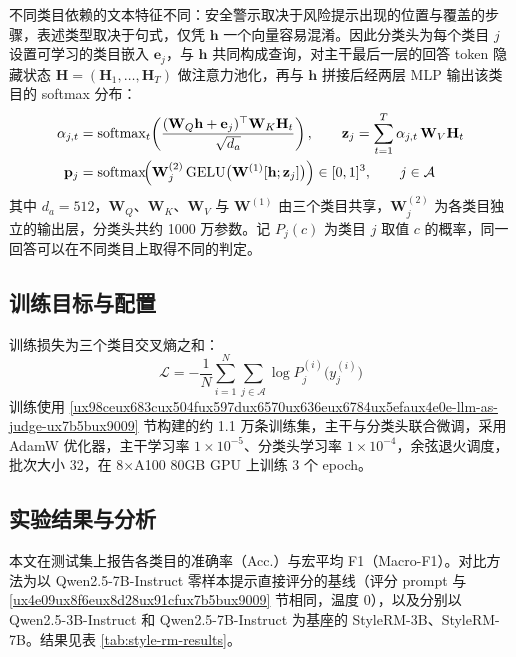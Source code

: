 \documentclass[fontset=fandol,type=master,campus=shenzhen,etitleauto=true]{hithesisbook}
\begin{document}
不同类目依赖的文本特征不同：安全警示取决于风险提示出现的位置与覆盖的步骤，表述类型取决于句式，仅凭 $\mathbf{h}$ 一个向量容易混淆。因此分类头为每个类目 $j$ 设置可学习的类目嵌入 $\mathbf{e}_j$，与 $\mathbf{h}$ 共同构成查询，对主干最后一层的回答 token 隐藏状态 $\mathbf{H} = (\mathbf{H}_1, \dots, \mathbf{H}_T)$ 做注意力池化，再与 $\mathbf{h}$ 拼接后经两层 MLP 输出该类目的 softmax 分布：
\begin{equation}
\begin{aligned}
\alpha_{j,t} &= \operatorname{softmax}_t\!\left( \frac{(\mathbf{W}_Q\mathbf{h} + \mathbf{e}_j)^{\top} \mathbf{W}_K \mathbf{H}_t}{\sqrt{d_a}} \right), \qquad \mathbf{z}_j = \sum_{t=1}^{T} \alpha_{j,t}\, \mathbf{W}_V \mathbf{H}_t \\
\mathbf{p}_j &= \operatorname{softmax}\!\Bigl( \mathbf{W}^{(2)}_j \operatorname{GELU}\bigl( \mathbf{W}^{(1)} [\mathbf{h}; \mathbf{z}_j] \bigr) \Bigr) \in [0,1]^{3}, \qquad j \in \mathcal{A}
\end{aligned}
\end{equation}
其中 $d_a = 512$，$\mathbf{W}_Q$、$\mathbf{W}_K$、$\mathbf{W}_V$ 与 $\mathbf{W}^{(1)}$ 由三个类目共享，$\mathbf{W}^{(2)}_j$ 为各类目独立的输出层，分类头共约 1000 万参数。记 $P_j(c)$ 为类目 $j$ 取值 $c$ 的概率，同一回答可以在不同类目上取得不同的判定。

\subsection{训练目标与配置}\label{ux8badux7ec3ux76eeux6807ux4e0eux4f18ux5316ux914dux7f6e-1}

训练损失为三个类目交叉熵之和：
\begin{equation}
\mathcal{L} = -\frac{1}{N}\sum_{i=1}^{N} \sum_{j \in \mathcal{A}} \log P^{(i)}_j\bigl(y^{(i)}_j\bigr)
\end{equation}
训练使用 \ref{ux98ceux683cux504fux597dux6570ux636eux6784ux5efaux4e0e-llm-as-judge-ux7b5bux9009} 节构建的约 1.1 万条训练集，主干与分类头联合微调，采用 AdamW 优化器，主干学习率 $1 \times 10^{-5}$、分类头学习率 $1 \times 10^{-4}$，余弦退火调度，批次大小 32，在 8×A100 80GB GPU 上训练 3 个 epoch。

\subsection{实验结果与分析}\label{ux98ceux683cux5224ux522bux5b9eux9a8cux7ed3ux679c}

本文在测试集上报告各类目的准确率（Acc.）与宏平均 F1（Macro-F1）。对比方法为以 Qwen2.5-7B-Instruct 零样本提示直接评分的基线（评分 prompt 与 \ref{ux4e09ux8f6eux8d28ux91cfux7b5bux9009} 节相同，温度 0），以及分别以 Qwen2.5-3B-Instruct 和 Qwen2.5-7B-Instruct 为基座的 StyleRM-3B、StyleRM-7B。结果见表 \ref{tab:style-rm-results}。
\end{document}
